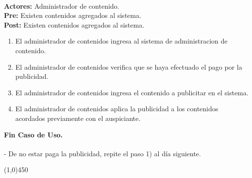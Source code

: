 \documentclass[11pt, a4paper, spanish]{article}
\begin{document}
 \\
\textbf{Actores:} Administrador de contenido. \\
\textbf{Pre:} Existen contenidos agregados al sistema. \\
\textbf{Post:} Existen contenidos agregados al sistema.\\
\begin{enumerate}
	\item El administrador de contenidos ingresa al sistema de administracion de contenido.
	\item El administrador de contenidos verifica que se haya efectuado el pago por la publicidad.
	\item El administrador de contenidos ingresa el contenido a publicitar en el sistema.
	\item El administrador de contenidos aplica la publicidad a los contenidos acordados previamente con el auspiciante.

\end{enumerate}
\textbf{Fin Caso de Uso.} \\
 \\
 - De no estar paga la publicidad, repite el paso 1) al día siguiente.
\begin{center} \line(1,0){450} \end{center}
\end{document}
